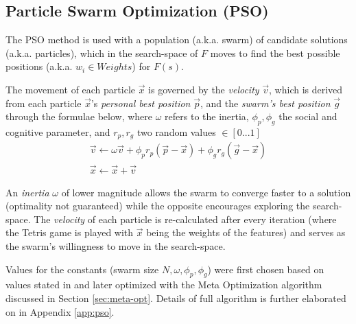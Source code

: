 \documentclass[12pt]{article}
\numberwithin{table}{section}
\numberwithin{figure}{section}
\begin{document}
\subsection{Particle Swarm Optimization (PSO)} \label{sec:PSO}
The PSO method is used with a population (a.k.a. swarm) of candidate solutions (a.k.a. particles), which in the search-space of $F$ moves to find the best possible positions (a.k.a. $w_i \in Weights$) for $F(s)$.

The movement of each particle $\vec{x}$ is governed by the \emph{velocity} $\vec{v}$, which is derived from each particle $\vec{x}$'s \emph{personal best position} $\vec{p}$, and the \emph{swarm's best position} $\vec{g}$ through the formulae below, where $\omega$ refers to the inertia, $\phi_p, \phi_g$ the social and cognitive parameter, and $r_p, r_g$ two random values $\in [0...1]$
\begin{gather*}
\vec{v}\leftarrow \omega\vec{v} + \phi_p r_p ( \vec{p} - \vec{x} ) + \phi_g r_g ( \vec{g} - \vec{x} )
\\
\vec{x}\leftarrow \vec{x} + \vec{v}
\end{gather*}

An \emph{inertia} $\omega$ of lower magnitude allows the swarm to converge faster to a solution (optimality not guaranteed) while the opposite encourages exploring the search-space. The \emph{velocity} of each particle is re-calculated after every iteration (where the Tetris game is played with $\vec{x}$ being the weights of the features) and serves as the swarm's willingness to move in the search-space.

Values for the constants (swarm size $N, \omega, \phi_p, \phi_g$) were first chosen based on values stated in \cite{VanDenBergh2006ATrajectories} and later optimized with the Meta Optimization algorithm discussed in Section \ref{sec:meta-opt}. Details of full algorithm is further elaborated on in Appendix \ref{app:pso}.

\end{document}

